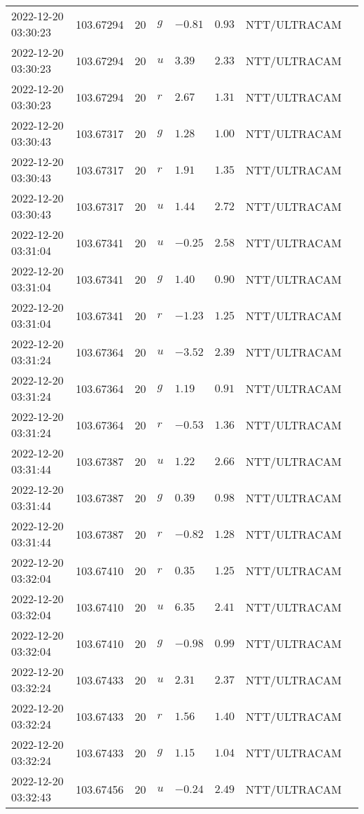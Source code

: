 \documentclass{nature_plusfigure}
\begin{document}
\begin{supplement}
\begin{center}
\begin{longtable}{llllllll}
2022-12-20 03:30:23 & 103.67294 & 20 & $g$ & $-0.81$ & $0.93$ & NTT/ULTRACAM &  \\ 
2022-12-20 03:30:23 & 103.67294 & 20 & $u$ & $3.39$ & $2.33$ & NTT/ULTRACAM &  \\ 
2022-12-20 03:30:23 & 103.67294 & 20 & $r$ & $2.67$ & $1.31$ & NTT/ULTRACAM &  \\ 
2022-12-20 03:30:43 & 103.67317 & 20 & $g$ & $1.28$ & $1.00$ & NTT/ULTRACAM &  \\ 
2022-12-20 03:30:43 & 103.67317 & 20 & $r$ & $1.91$ & $1.35$ & NTT/ULTRACAM &  \\ 
2022-12-20 03:30:43 & 103.67317 & 20 & $u$ & $1.44$ & $2.72$ & NTT/ULTRACAM &  \\ 
2022-12-20 03:31:04 & 103.67341 & 20 & $u$ & $-0.25$ & $2.58$ & NTT/ULTRACAM &  \\ 
2022-12-20 03:31:04 & 103.67341 & 20 & $g$ & $1.40$ & $0.90$ & NTT/ULTRACAM &  \\ 
2022-12-20 03:31:04 & 103.67341 & 20 & $r$ & $-1.23$ & $1.25$ & NTT/ULTRACAM &  \\ 
2022-12-20 03:31:24 & 103.67364 & 20 & $u$ & $-3.52$ & $2.39$ & NTT/ULTRACAM &  \\ 
2022-12-20 03:31:24 & 103.67364 & 20 & $g$ & $1.19$ & $0.91$ & NTT/ULTRACAM &  \\ 
2022-12-20 03:31:24 & 103.67364 & 20 & $r$ & $-0.53$ & $1.36$ & NTT/ULTRACAM &  \\ 
2022-12-20 03:31:44 & 103.67387 & 20 & $u$ & $1.22$ & $2.66$ & NTT/ULTRACAM &  \\ 
2022-12-20 03:31:44 & 103.67387 & 20 & $g$ & $0.39$ & $0.98$ & NTT/ULTRACAM &  \\ 
2022-12-20 03:31:44 & 103.67387 & 20 & $r$ & $-0.82$ & $1.28$ & NTT/ULTRACAM &  \\ 
2022-12-20 03:32:04 & 103.67410 & 20 & $r$ & $0.35$ & $1.25$ & NTT/ULTRACAM &  \\ 
2022-12-20 03:32:04 & 103.67410 & 20 & $u$ & $6.35$ & $2.41$ & NTT/ULTRACAM &  \\ 
2022-12-20 03:32:04 & 103.67410 & 20 & $g$ & $-0.98$ & $0.99$ & NTT/ULTRACAM &  \\ 
2022-12-20 03:32:24 & 103.67433 & 20 & $u$ & $2.31$ & $2.37$ & NTT/ULTRACAM &  \\ 
2022-12-20 03:32:24 & 103.67433 & 20 & $r$ & $1.56$ & $1.40$ & NTT/ULTRACAM &  \\ 
2022-12-20 03:32:24 & 103.67433 & 20 & $g$ & $1.15$ & $1.04$ & NTT/ULTRACAM &  \\ 
2022-12-20 03:32:43 & 103.67456 & 20 & $u$ & $-0.24$ & $2.49$ & NTT/ULTRACAM &  \\ 

\end{longtable}
\end{center}
\end{supplement}
\end{document}
